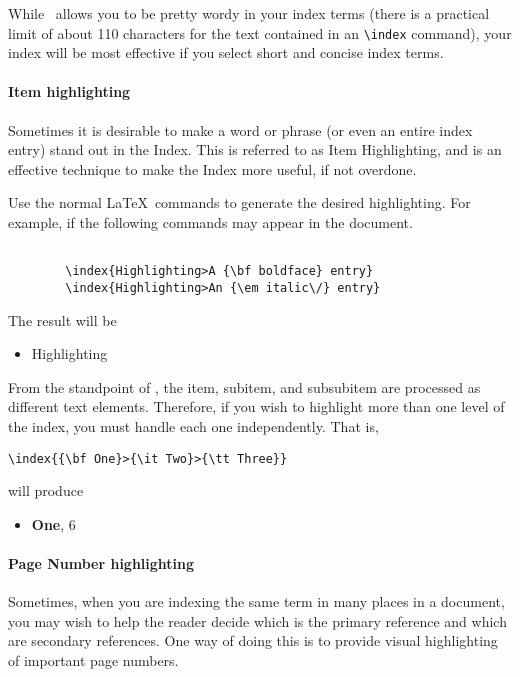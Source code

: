 While \IdxTeX\ allows you to be pretty wordy in your index terms (there is a
practical limit of about 110 characters for the text contained in an
\verb+\index+ command), your index will be most effective if you select short
and concise index terms.   

\paragraph{Item   highlighting} 
Sometimes it is desirable to make a word or phrase (or even an entire index
entry) stand out in the Index.  This is referred to as Item Highlighting, and
is an effective technique to make the Index more useful, if not overdone.

Use the normal \LaTeX\ commands to generate the desired highlighting.  For 
example, if the following commands may appear in the document.
\begin{verbatim}

        \index{Highlighting>A {\bf boldface} entry}
        \index{Highlighting>An {\em italic\/} entry}

\end{verbatim}
The result will be 
\begin{itemize}
\item{Highlighting}
\end{itemize}
From the standpoint of \IdxTeX, the item, subitem, and subsubitem are processed
as different text elements.  Therefore, if you wish to highlight more than one
level of the index, you must handle each one independently.  That is,
\begin{verbatim}
\index{{\bf One}>{\it Two}>{\tt Three}}
\end{verbatim}
will produce
\begin{itemize}
\item{{\bf One}, \mbox{\rm 6}} 
\end{itemize}

\paragraph{Page Number highlighting}  Sometimes, when you are indexing the same
term in many places in a document, you may wish to help the reader decide which
is the primary  reference and which are secondary references.  One way of doing
this is to provide visual highlighting of important page numbers.

